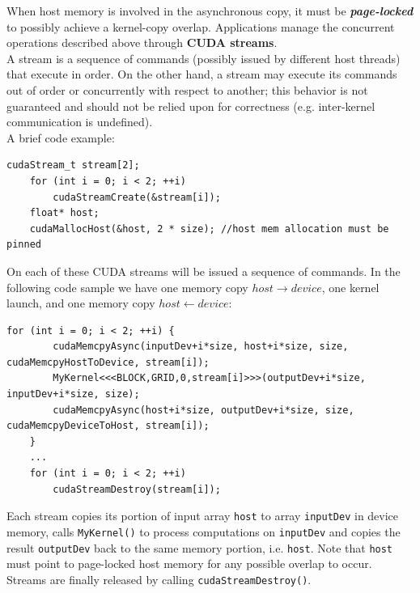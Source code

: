 	When host memory is involved in the asynchronous copy, it must be \textit{\textbf{page-locked}} to possibly achieve a kernel-copy overlap\cite{cudastrandconcurr}.
	Applications manage the concurrent operations described above through \textbf{CUDA streams}.\\
	A stream is a sequence of commands (possibly issued by different host threads) that execute in order. On the other hand, a stream may execute its commands out of order or concurrently with respect to another; this behavior is not guaranteed and	should not be relied upon for correctness (e.g. inter-kernel communication is undefined)\cite{cudaguide,custreamsblog}.\\
	A brief code example:
	\begin{lstlisting}[caption={CUDA Strams creation}]
	cudaStream_t stream[2];
	for (int i = 0; i < 2; ++i)
		cudaStreamCreate(&stream[i]);
	float* host;
	cudaMallocHost(&host, 2 * size); //host mem allocation must be pinned
	\end{lstlisting}	
	
	On each of these CUDA streams will be issued a sequence of commands. In the following code sample we have one memory copy \(host \rightarrow device\), one kernel launch, and one memory copy \(host \leftarrow device\):
	\begin{lstlisting}[caption={CUDA Strams and Async example}]
	for (int i = 0; i < 2; ++i) {
		cudaMemcpyAsync(inputDev+i*size, host+i*size, size, cudaMemcpyHostToDevice, stream[i]);
		MyKernel<<<BLOCK,GRID,0,stream[i]>>>(outputDev+i*size, inputDev+i*size, size);
		cudaMemcpyAsync(host+i*size, outputDev+i*size, size, cudaMemcpyDeviceToHost, stream[i]);
	}
	...	
	for (int i = 0; i < 2; ++i)
		cudaStreamDestroy(stream[i]);
	\end{lstlisting}
	
	Each stream copies its portion of input array \texttt{host} to array \texttt{inputDev} in device memory, calls \texttt{MyKernel()} to process computations on \texttt{inputDev} and copies
	the result \texttt{outputDev} back to the same memory portion, i.e. \texttt{host}. Note that \texttt{host} must point to page-locked host memory for any possible overlap to occur.\\
	Streams are finally released by calling \texttt{cudaStreamDestroy()}.


